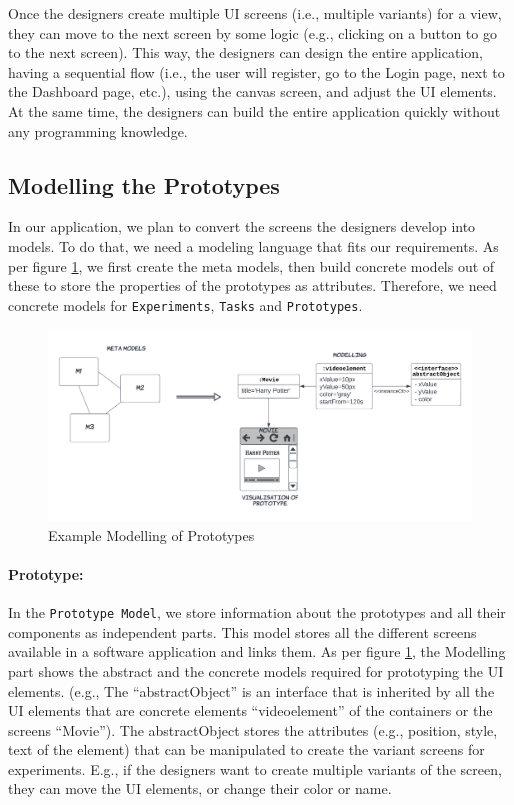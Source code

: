 Once the designers create multiple UI screens (i.e., multiple variants) for a view, they can move to the next screen by some logic (e.g., clicking on a button to go to the next screen).
This way, the designers can design the entire application, having a sequential flow (i.e., the user will register, go to the Login page, next to the Dashboard page, etc.), using the canvas screen, and adjust the UI elements.
At the same time, the designers can build the entire application quickly without any programming knowledge.

\subsection{Modelling the Prototypes}
\label{solutionideas:subsection:modelling}

In our application, we plan to convert the screens the designers develop into models. 
To do that, we need a modeling language that fits our requirements. As per figure \ref{solutionideas:fig:metamodel}, we first create the meta models, then build concrete models out of these to store the properties of the prototypes as attributes.
Therefore, we need concrete models for \texttt{Experiments}, \texttt{Tasks} and \texttt{Prototypes}.

\begin{figure}[bt]
	\centering
  \includegraphics[width=1.05\textwidth]{images/solution-ideas/MetaModel.png}
	\caption{Example Modelling of Prototypes}
	\label{solutionideas:fig:metamodel}
\end{figure}

\paragraph{Prototype:} In the \texttt{Prototype Model}, we store information about the prototypes and all their components as independent parts.
This model stores all the different screens available in a software application and links them.
As per figure \ref{solutionideas:fig:metamodel}, the Modelling part shows the abstract and the concrete models required for prototyping the UI elements. 
(e.g., The ``abstractObject'' is an interface that is inherited by all the UI elements that are concrete elements ``videoelement'' of the containers or the screens ``Movie'').
The abstractObject stores the attributes (e.g., position, style, text of the element) that can be manipulated to create the variant screens for experiments.
E.g., if the designers want to create multiple variants of the screen, they can move the UI elements, or change their color or name.

